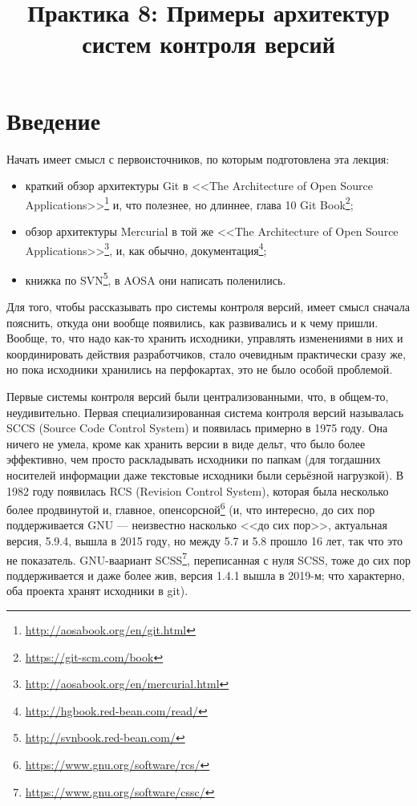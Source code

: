 \documentclass[a5paper]{article}
\title{Практика 8: Примеры архитектур систем контроля версий}
\date{}
\begin{document}
\maketitle
\thispagestyle{empty}

\section{Введение}

Начать имеет смысл с первоисточников, по которым подготовлена эта лекция:
\begin{itemize}
	\item краткий обзор архитектуры Git в <<The Architecture of Open Source Applications>>\footnote{\url{http://aosabook.org/en/git.html}} и, что полезнее, но длиннее, глава 10 Git Book\footnote{\url{https://git-scm.com/book}};
	\item обзор архитектуры Mercurial в той же <<The Architecture of Open Source Applications>>\footnote{\url{http://aosabook.org/en/mercurial.html}}, и, как обычно, документация\footnote{\url{http://hgbook.red-bean.com/read/}};
	\item книжка по SVN\footnote{\url{http://svnbook.red-bean.com/}}, в AOSA они написать поленились.
\end{itemize}

Для того, чтобы рассказывать про системы контроля версий, имеет смысл сначала пояснить, откуда они вообще появились, как развивались и к чему пришли. Вообще, то, что надо как-то хранить исходники, управлять изменениями в них и координировать действия разработчиков, стало очевидным практически сразу же, но пока исходники хранились на перфокартах, это не было особой проблемой.

Первые системы контроля версий были централизованными, что, в общем-то, неудивительно. Первая специализированная система контроля версий называлась SCCS (Source Code Control System) и появилась примерно в 1975 году. Она ничего не умела, кроме как хранить версии в виде дельт, что было более эффективно, чем просто раскладывать исходники по папкам (для тогдашних носителей информации даже текстовые исходники были серьёзной нагрузкой). В 1982 году появилась RCS (Revision Control System), которая была несколько более продвинутой и, главное, опенсорсной\footnote{\url{https://www.gnu.org/software/rcs/}} (и, что интересно, до сих пор поддерживается GNU --- неизвестно насколько <<до сих пор>>, актуальная версия, 5.9.4, вышла в 2015 году, но между 5.7 и 5.8 прошло 16 лет, так что это не показатель. GNU-ваариант SCSS\footnote{\url{https://www.gnu.org/software/cssc/}}, переписанная с нуля SCSS, тоже до сих пор поддерживается и даже более жив, версия 1.4.1 вышла в 2019-м; что характерно, оба проекта хранят исходники в git).
\end{document}
